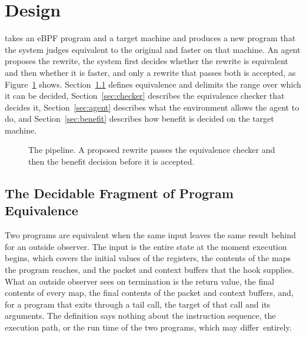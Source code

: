 \section{\sys Design}\label{sec:design}

\sys takes an eBPF program and a target machine and produces a new program that the system judges equivalent to the original and faster on that machine.
An agent proposes the rewrite, the system first decides whether the rewrite is equivalent and then whether it is faster, and only a rewrite that passes both is accepted, as Figure~\ref{fig:arch} shows.
Section~\ref{sec:equiv} defines equivalence and delimits the range over which it can be decided, Section~\ref{sec:checker} describes the equivalence checker that decides it, Section~\ref{sec:agent} describes what the environment allows the agent to do, and Section~\ref{sec:benefit} describes how benefit is decided on the target machine.

\begin{figure}[t]
\centering

\caption{The \sys pipeline. A proposed rewrite passes the equivalence checker and then the benefit decision before it is accepted.}
\label{fig:arch}
\end{figure}

\subsection{The Decidable Fragment of Program Equivalence}\label{sec:equiv}

Two programs are equivalent when the same input leaves the same result behind for an outside observer.
The input is the entire state at the moment execution begins, which covers the initial values of the registers, the contents of the maps the program reaches, and the packet and context buffers that the hook supplies.
What an outside observer sees on termination is the return value, the final contents of every map, the final contents of the packet and context buffers, and, for a program that exits through a tail call, the target of that call and its arguments.
The definition says nothing about the instruction sequence, the execution path, or the run time of the two programs, which may differ~entirely.


